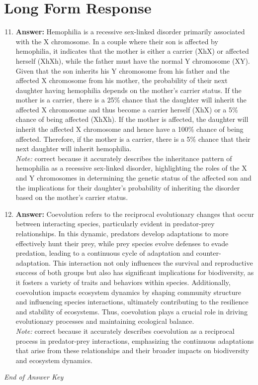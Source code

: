 \documentclass[12pt]{article}
\begin{document}
\section*{Long Form Response}
\begin{enumerate}[label=\arabic*.]
\setcounter{enumi}{10}
\item \textbf{Answer:} Hemophilia is a recessive sex-linked disorder primarily associated with the X chromosome. In a couple where their son is affected by hemophilia, it indicates that the mother is either a carrier (XhX) or affected herself (XhXh), while the father must have the normal Y chromosome (XY). Given that the son inherits his Y chromosome from his father and the affected X chromosome from his mother, the probability of their next daughter having hemophilia depends on the mother's carrier status. If the mother is a carrier, there is a 25\% chance that the daughter will inherit the affected X chromosome and thus become a carrier herself (XhX) or a 5\% chance of being affected (XhXh). If the mother is affected, the daughter will inherit the affected X chromosome and hence have a 100\% chance of being affected. Therefore, if the mother is a carrier, there is a 5\% chance that their next daughter will inherit hemophilia.
\\ \textit{Note:} correct because it accurately describes the inheritance pattern of hemophilia as a recessive sex-linked disorder, highlighting the roles of the X and Y chromosomes in determining the genetic status of the affected son and the implications for their daughter's probability of inheriting the disorder based on the mother's carrier status.
\item \textbf{Answer:} Coevolution refers to the reciprocal evolutionary changes that occur between interacting species, particularly evident in predator-prey relationships. In this dynamic, predators develop adaptations to more effectively hunt their prey, while prey species evolve defenses to evade predation, leading to a continuous cycle of adaptation and counter- adaptation. This interaction not only influences the survival and reproductive success of both groups but also has significant implications for biodiversity, as it fosters a variety of traits and behaviors within species. Additionally, coevolution impacts ecosystem dynamics by shaping community structure and influencing species interactions, ultimately contributing to the resilience and stability of ecosystems. Thus, coevolution plays a crucial role in driving evolutionary processes and maintaining ecological balance.
\\ \textit{Note:} correct because it accurately describes coevolution as a reciprocal process in predator-prey interactions, emphasizing the continuous adaptations that arise from these relationships and their broader impacts on biodiversity and ecosystem dynamics.
\end{enumerate}

\vfill
\noindent\textit{End of Answer Key}
\end{document}
